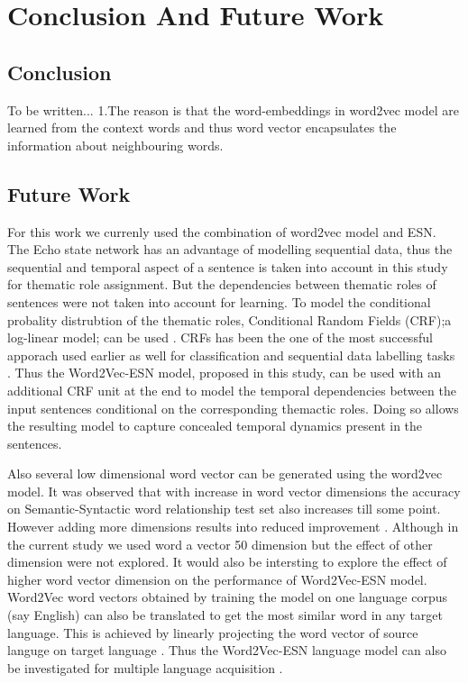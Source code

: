 \chapter{Conclusion And Future Work}\label{conclusion}


\section{Conclusion}

To be written...
1.The reason is that the word-embeddings in word2vec model are learned from the context words and thus word vector encapsulates the information about neighbouring words.  

\section{Future Work}

For this work we currenly used the combination of word2vec model and ESN. The Echo state network has an advantage of modelling sequential data, thus the sequential and temporal aspect of a sentence is taken into account in this study for thematic role assignment. But the dependencies between thematic roles of sentences were not taken into account for learning. To model the conditional probality distrubtion of the thematic roles, Conditional Random Fields (CRF);a log-linear model; can be used \cite{crf:intro:sutton}. CRFs has been the one of the most successful apporach used earlier as well for classification and sequential data labelling tasks \cite{end-to-end, esn:esn_crf}. Thus the Word2Vec-ESN model, proposed in this study, can be used with an additional CRF unit at the end to model the temporal dependencies between the input sentences conditional on the corresponding themactic roles. Doing so allows the resulting model to capture concealed temporal dynamics present in the sentences\cite{esn:esn_crf}. 

Also several low dimensional word vector can be generated using the word2vec model. It was observed that with increase in word vector dimensions the accuracy on Semantic-Syntactic word relationship test set \cite{w2v:regularities_in_word_representations}  also increases till some point. However adding more dimensions results into reduced improvement \cite{w2v:mikolov_2013_efficient}. Although in the current study we used word a vector 50 dimension but the effect of other dimension were not explored. It would also be intersting to explore the effect of higher word vector dimension on the performance of Word2Vec-ESN model. Word2Vec word vectors obtained by training the model on one language corpus (say English) can also be translated to get the most similar word in any target language. This is achieved by linearly projecting the word vector of source languge on target language \cite{w2v:language_similarities}. Thus the Word2Vec-ESN language model can also be investigated for multiple language acquisition \cite{hinaut_multiple_lang}. 